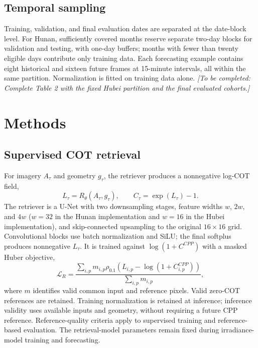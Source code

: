 \documentclass[11pt]{article}
\newcommand{\pending}[1]{{\color{pendingcolor}\textit{[To be completed: #1]}}}
\begin{document}
\FloatBarrier
\subsection{Temporal sampling}
Training, validation, and final evaluation dates are separated at the date-block level. For Hunan, sufficiently covered months reserve separate two-day blocks for validation and testing, with one-day buffers; months with fewer than twenty eligible days contribute only training data. Each forecasting example contains eight historical and sixteen future frames at 15-minute intervals, all within the same partition. Normalization is fitted on training data alone. \pending{Complete Table 2 with the fixed Hubei partition and the final evaluated cohorts.}

\section{Methods}
\subsection{Supervised COT retrieval}
For imagery $A_\tau$ and geometry $g_\tau$, the retriever produces a nonnegative log-COT field,
\begin{equation}
L_\tau=R_\theta(A_\tau,g_\tau),\qquad C_\tau=\exp(L_\tau)-1.
\label{eq:retrieval}
\end{equation}
The retriever is a U-Net with two downsampling stages, feature widths $w$, $2w$, and $4w$ ($w=32$ in the Hunan implementation and $w=16$ in the Hubei implementation), and skip-connected upsampling to the original $16\times16$ grid. Convolutional blocks use batch normalization and SiLU; the final softplus produces nonnegative $L_\tau$. It is trained against $\log(1+C^{CPP})$ with a masked Huber objective,
\begin{equation}
\mathcal L_R=\frac{\sum_{i,p}m_{i,p}\rho_{0.1}\!\left(L_{i,p}-\log(1+C^{CPP}_{i,p})\right)}{\sum_{i,p}m_{i,p}},
\label{eq:retrieval-loss}
\end{equation}
where $m$ identifies valid common input and reference pixels. Valid zero-COT references are retained. Training normalization is retained at inference; inference validity uses available inputs and geometry, without requiring a future CPP reference. Reference-quality criteria apply to supervised training and reference-based evaluation. The retrieval-model parameters remain fixed during irradiance-model training and forecasting.

\FloatBarrier
\end{document}

